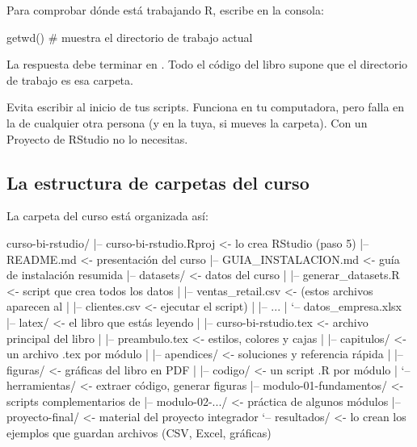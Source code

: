 Para comprobar dónde está trabajando R, escribe en la consola:

\begin{rnoejecutar}
getwd()   # muestra el directorio de trabajo actual
\end{rnoejecutar}

La respuesta debe terminar en . Todo el código
del libro supone que el directorio de trabajo es esa carpeta.

\begin{advertencia}
Evita escribir  al inicio de tus
scripts. Funciona en tu computadora, pero falla en la de cualquier otra
persona (y en la tuya, si mueves la carpeta). Con un Proyecto de RStudio no
lo necesitas.
\end{advertencia}

\subsection{La estructura de carpetas del curso}

La carpeta del curso está organizada así:

\begin{textocodigo}
curso-bi-rstudio/
|-- curso-bi-rstudio.Rproj    <- lo crea RStudio (paso 5)
|-- README.md                 <- presentación del curso
|-- GUIA_INSTALACION.md       <- guía de instalación resumida
|-- datasets/                 <- datos del curso
|   |-- generar_datasets.R    <- script que crea todos los datos
|   |-- ventas_retail.csv     <- (estos archivos aparecen al
|   |-- clientes.csv          <-  ejecutar el script)
|   |-- ...
|   `-- datos_empresa.xlsx
|-- latex/                    <- el libro que estás leyendo
|   |-- curso-bi-rstudio.tex  <- archivo principal del libro
|   |-- preambulo.tex         <- estilos, colores y cajas
|   |-- capitulos/            <- un archivo .tex por módulo
|   |-- apendices/            <- soluciones y referencia rápida
|   |-- figuras/              <- gráficas del libro en PDF
|   |-- codigo/               <- un script .R por módulo
|   `-- herramientas/         <- extraer código, generar figuras
|-- modulo-01-fundamentos/    <- scripts complementarios de
|-- modulo-02-.../            <-  práctica de algunos módulos
|-- proyecto-final/           <- material del proyecto integrador
`-- resultados/               <- lo crean los ejemplos que guardan
                                 archivos (CSV, Excel, gráficas)
\end{textocodigo}


